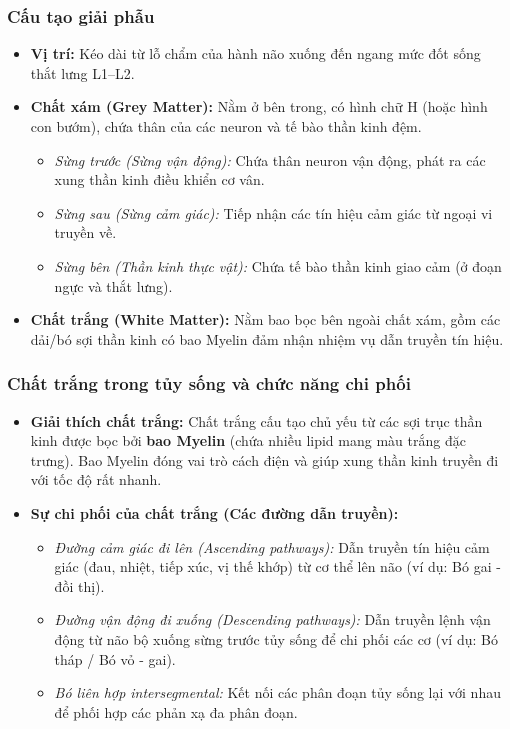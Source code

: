 \subsubsection{Cấu tạo giải phẫu}
\begin{itemize}
    \item \textbf{Vị trí:} Kéo dài từ lỗ chẩm của hành não xuống đến ngang mức đốt sống thắt lưng L1--L2.
    \item \textbf{Chất xám (Grey Matter):} Nằm ở bên trong, có hình chữ H (hoặc hình con bướm), chứa thân của các neuron và tế bào thần kinh đệm.
    \begin{itemize}
        \item \textit{Sừng trước (Sừng vận động):} Chứa thân neuron vận động, phát ra các xung thần kinh điều khiển cơ vân.
        \item \textit{Sừng sau (Sừng cảm giác):} Tiếp nhận các tín hiệu cảm giác từ ngoại vi truyền về.
        \item \textit{Sừng bên (Thần kinh thực vật):} Chứa tế bào thần kinh giao cảm (ở đoạn ngực và thắt lưng).
    \end{itemize}
    \item \textbf{Chất trắng (White Matter):} Nằm bao bọc bên ngoài chất xám, gồm các dải/bó sợi thần kinh có bao Myelin đảm nhận nhiệm vụ dẫn truyền tín hiệu.
\end{itemize}

\subsubsection{Chất trắng trong tủy sống và chức năng chi phối}
\begin{itemize}
    \item \textbf{Giải thích chất trắng:} Chất trắng cấu tạo chủ yếu từ các sợi trục thần kinh được bọc bởi \textbf{bao Myelin} (chứa nhiều lipid mang màu trắng đặc trưng). Bao Myelin đóng vai trò cách điện và giúp xung thần kinh truyền đi với tốc độ rất nhanh.
    \item \textbf{Sự chi phối của chất trắng (Các đường dẫn truyền):}
    \begin{itemize}
        \item \textit{Đường cảm giác đi lên (Ascending pathways):} Dẫn truyền tín hiệu cảm giác (đau, nhiệt, tiếp xúc, vị thế khớp) từ cơ thể lên não (ví dụ: Bó gai - đồi thị).
        \item \textit{Đường vận động đi xuống (Descending pathways):} Dẫn truyền lệnh vận động từ não bộ xuống sừng trước tủy sống để chi phối các cơ (ví dụ: Bó tháp / Bó vỏ - gai).
        \item \textit{Bó liên hợp intersegmental:} Kết nối các phân đoạn tủy sống lại với nhau để phối hợp các phản xạ đa phân đoạn.
    \end{itemize}
\end{itemize}


